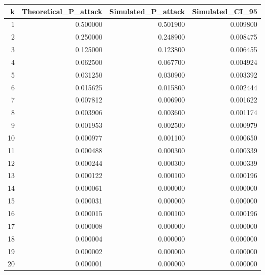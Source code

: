 \begin{tabular}{rrrr}
\toprule
k & Theoretical_P_attack & Simulated_P_attack & Simulated_CI_95 \\
\midrule
1 & 0.500000 & 0.501900 & 0.009800 \\
2 & 0.250000 & 0.248900 & 0.008475 \\
3 & 0.125000 & 0.123800 & 0.006455 \\
4 & 0.062500 & 0.067700 & 0.004924 \\
5 & 0.031250 & 0.030900 & 0.003392 \\
6 & 0.015625 & 0.015800 & 0.002444 \\
7 & 0.007812 & 0.006900 & 0.001622 \\
8 & 0.003906 & 0.003600 & 0.001174 \\
9 & 0.001953 & 0.002500 & 0.000979 \\
10 & 0.000977 & 0.001100 & 0.000650 \\
11 & 0.000488 & 0.000300 & 0.000339 \\
12 & 0.000244 & 0.000300 & 0.000339 \\
13 & 0.000122 & 0.000100 & 0.000196 \\
14 & 0.000061 & 0.000000 & 0.000000 \\
15 & 0.000031 & 0.000000 & 0.000000 \\
16 & 0.000015 & 0.000100 & 0.000196 \\
17 & 0.000008 & 0.000000 & 0.000000 \\
18 & 0.000004 & 0.000000 & 0.000000 \\
19 & 0.000002 & 0.000000 & 0.000000 \\
20 & 0.000001 & 0.000000 & 0.000000 \\
\bottomrule
\end{tabular}
